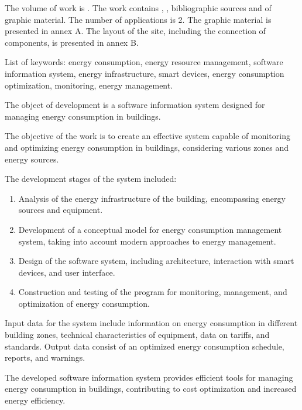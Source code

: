 The volume of work is . The work contains , ,  bibliographic sources and  of graphic material. The number of applications is 2. The graphic material is presented in annex A. The layout of the site, including the connection of components, is presented in annex B.

List of keywords: energy consumption, energy resource management, software information system, energy infrastructure, smart devices, energy consumption optimization, monitoring, energy management.

The object of development is a software information system designed for managing energy consumption in buildings.

The objective of the work is to create an effective system capable of monitoring and optimizing energy consumption in buildings, considering various zones and energy sources.

The development stages of the system included:
\begin{enumerate}
	\item Analysis of the energy infrastructure of the building, encompassing energy sources and equipment.
	\item Development of a conceptual model for energy consumption management system, taking into account modern approaches to energy management.
	\item Design of the software system, including architecture, interaction with smart devices, and user interface.
	\item Construction and testing of the program for monitoring, management, and optimization of energy consumption.
\end{enumerate}

Input data for the system include information on energy consumption in different building zones, technical characteristics of equipment, data on tariffs, and standards. Output data consist of an optimized energy consumption schedule, reports, and warnings.

The developed software information system provides efficient tools for managing energy consumption in buildings, contributing to cost optimization and increased energy efficiency.
